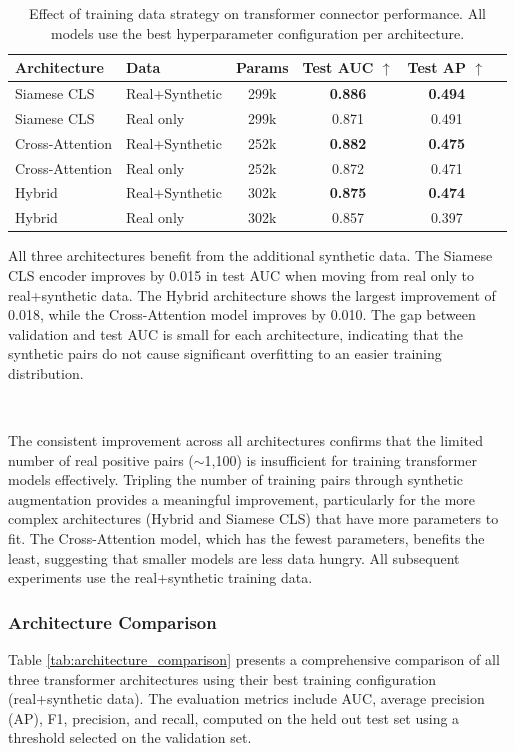 \begin{table}[H]
\centering
\begin{tabular}{llcccc}
\toprule
\textbf{Architecture} & \textbf{Data} & \textbf{Params} & \textbf{Test AUC $\uparrow$} & \textbf{Test AP $\uparrow$} \\
\midrule
Siamese CLS     & Real+Synthetic & 299k  & \textbf{0.886} & \textbf{0.494} \\
Siamese CLS     & Real only      & 299k  & 0.871 & 0.491 \\
\midrule
Cross-Attention  & Real+Synthetic & 252k  & \textbf{0.882} & \textbf{0.475} \\
Cross-Attention  & Real only      & 252k  & 0.872 & 0.471 \\
\midrule
Hybrid           & Real+Synthetic & 302k  & \textbf{0.875} & \textbf{0.474} \\
Hybrid           & Real only      & 302k  & 0.857 & 0.397 \\
\bottomrule
\end{tabular}
\caption{Effect of training data strategy on transformer connector performance. All models use the best hyperparameter configuration per architecture.}
\label{tab:data_strategy}
\end{table}

All three architectures benefit from the additional synthetic data. The Siamese CLS encoder improves by 0.015 in test AUC when moving from real only to real+synthetic data. The Hybrid architecture shows the largest improvement of 0.018, while the Cross-Attention model improves by 0.010. The gap between validation and test AUC is small for each architecture, indicating that the synthetic pairs do not cause significant overfitting to an easier training distribution.

\

The consistent improvement across all architectures confirms that the limited number of real positive pairs ($\sim$1{,}100) is insufficient for training transformer models effectively. Tripling the number of training pairs through synthetic augmentation provides a meaningful improvement, particularly for the more complex architectures (Hybrid and Siamese CLS) that have more parameters to fit. The Cross-Attention model, which has the fewest parameters, benefits the least, suggesting that smaller models are less data hungry. All subsequent experiments use the real+synthetic training data.


\subsubsection{Architecture Comparison}\label{sec:architecture_comparison}
Table \ref{tab:architecture_comparison} presents a comprehensive comparison of all three transformer architectures using their best training configuration (real+synthetic data). The evaluation metrics include AUC, average precision (AP), F1, precision, and recall, computed on the held out test set using a threshold selected on the validation set.

